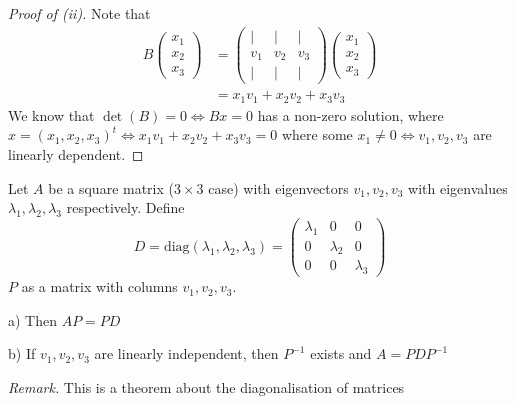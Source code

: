 \documentclass[10pt]{scrartcl}
\begin{document}
\begin{proof}[Proof of (ii)]
Note that 
\begin{align*}
  B\begin{pmatrix}
x_1 \\ x_2 \\ x_3	
\end{pmatrix} &= \begin{pmatrix}
 | & | & | \\ v_1 & v_2 & v_3 \\ | & | & |	
 \end{pmatrix}
\begin{pmatrix}
x_1 \\ x_2 \\ x_3	
\end{pmatrix}\\
&= x_1v_1 + x_2v_2 + x_3v_3
\end{align*}
We know that $\det(B) = 0 \iff Bx = 0$ has a non-zero solution, where $x =(x_1,x_2,x_3)^t \iff x_1v_1 + x_2v_2 + x_3v_3 = 0$ where some $x_1 \neq 0 \iff v_1,v_2,v_3$ are linearly dependent. 
\end{proof}\vsp

\begin{theorem}
Let $A$ be a square matrix ($3 \times 3$ case) with eigenvectors $v_1,v_2,v_3$ with eigenvalues $\lambda_1,\lambda_2,\lambda_3$ respectively. Define 
\[
  D = \mathrm{diag}(\lambda_1,\lambda_2,\lambda_3) = \begin{pmatrix}
 \lambda_1 & 0 & 0\\ 0 & \lambda_2 & 0\\ 0 & 0 & \lambda_3	
 \end{pmatrix}
\]
$P$ as a matrix with columns $v_1,v_2,v_3$. 

a) Then $AP = PD$

b) If $v_1,v_2,v_3$ are linearly independent, then $P^{-1}$ exists and $A = PDP^{-1}$
\end{theorem}\vsp

\emph{Remark.} This is a theorem about the diagonalisation of matrices
\end{document}
